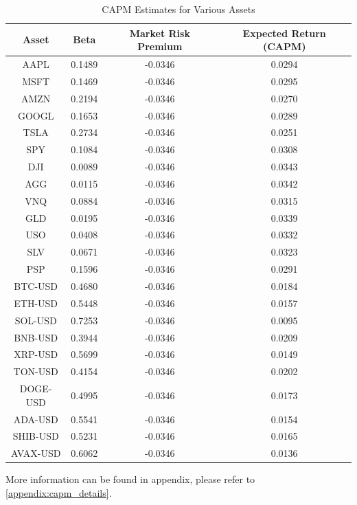 \begin{table}[ht]
\centering
\begin{tabular}{|c|c|c|c|}
\hline
\textbf{Asset} & \textbf{Beta} & \textbf{Market Risk Premium} & \textbf{Expected Return (CAPM)} \\
\hline
AAPL & 0.1489 & -0.0346 & 0.0294 \\
MSFT & 0.1469 & -0.0346 & 0.0295 \\
AMZN & 0.2194 & -0.0346 & 0.0270 \\
GOOGL & 0.1653 & -0.0346 & 0.0289 \\
TSLA & 0.2734 & -0.0346 & 0.0251 \\
SPY & 0.1084 & -0.0346 & 0.0308 \\
DJI & 0.0089 & -0.0346 & 0.0343 \\
AGG & 0.0115 & -0.0346 & 0.0342 \\
VNQ & 0.0884 & -0.0346 & 0.0315 \\
GLD & 0.0195 & -0.0346 & 0.0339 \\
USO & 0.0408 & -0.0346 & 0.0332 \\
SLV & 0.0671 & -0.0346 & 0.0323 \\
PSP & 0.1596 & -0.0346 & 0.0291 \\
BTC-USD & 0.4680 & -0.0346 & 0.0184 \\
ETH-USD & 0.5448 & -0.0346 & 0.0157 \\
SOL-USD & 0.7253 & -0.0346 & 0.0095 \\
BNB-USD & 0.3944 & -0.0346 & 0.0209 \\
XRP-USD & 0.5699 & -0.0346 & 0.0149 \\
TON-USD & 0.4154 & -0.0346 & 0.0202 \\
DOGE-USD & 0.4995 & -0.0346 & 0.0173 \\
ADA-USD & 0.5541 & -0.0346 & 0.0154 \\
SHIB-USD & 0.5231 & -0.0346 & 0.0165 \\
AVAX-USD & 0.6062 & -0.0346 & 0.0136 \\
\hline
\end{tabular}
\caption{CAPM Estimates for Various Assets}
\label{tab:capm}
\end{table}


More information can be found in appendix, please refer to \ref{appendix:capm_details}.

